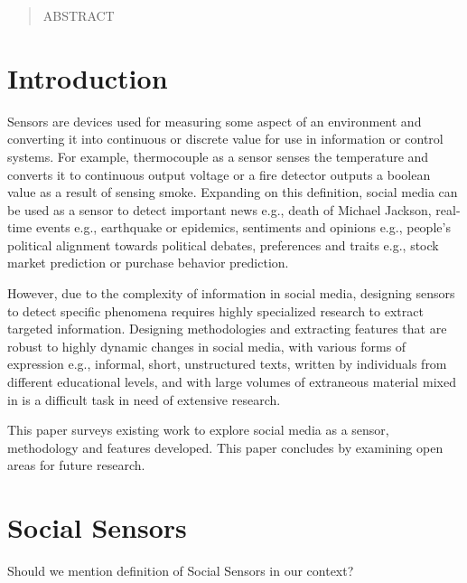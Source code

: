\documentclass{acm_proc_article-sp}
\begin{document}
\maketitle
\begin{abstract}
ABSTRACT
\end{abstract}




\section{Introduction}
Sensors are devices used for measuring some aspect of an environment and converting it into continuous or discrete value for use in information or control systems. For example, thermocouple as a sensor senses the temperature and converts it to continuous output voltage or a fire detector outputs a boolean value as a result of sensing smoke. Expanding on this definition, social media can be used as a sensor to detect important news e.g., death of Michael Jackson, real-time events e.g., earthquake or epidemics, sentiments and opinions e.g., people's political alignment towards political debates, preferences and traits e.g., stock market prediction or purchase behavior prediction.

However, due to the complexity of information in social media, designing sensors to detect specific phenomena requires highly specialized research to extract targeted information. Designing methodologies and extracting features that are robust to highly dynamic changes in social media, with various forms of expression e.g., informal, short, unstructured texts, written by individuals from different educational levels, and with large volumes of extraneous material mixed in is a difficult task in need of extensive research. 

This paper surveys existing work to explore social media as a sensor, methodology and features developed. This paper concludes by examining open areas for future research.

\section{Social Sensors}
Should we mention definition of Social Sensors in our context?
\end{document}
